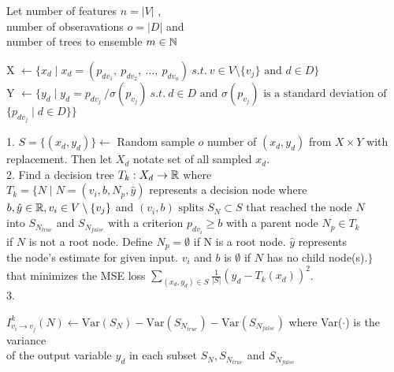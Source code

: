 \begin{algorithm}[H]
    \DontPrintSemicolon

    Let number of features $n = |V|$ , \\
    number of obseravations $o = |D|$ and \\
    number of trees to ensemble $ m \in \Bbb N$

     {
        X $\gets \{ x_d \mid x_d = (p_{dv_1},\: p_{dv_2},\: \ldots, \:p_{dv_{n}}) \: s.t. \: v \in V \setminus{\{v_j\}} \text{ and } d \in D \} \:$  \\
        Y $\gets \{ y_d  \mid y_d = p_{dv_j} \: / \sigma(p_{v_j}) \: s.t. \: d \in D \text{ and } \sigma(p_{v_j}) \text{ is a standard deviation of }$ \\
        $\{ p_{dv_j} \mid d \in D \} \}$\\

         {
            1. $S = \{(x_d, y_d)\} \gets $ Random sample $o$ number of $(x_d, y_d)$ from $X \times Y$ with replacement. Then let $X_d$ notate set of all sampled $x_d$. \\
            2. Find a decision tree $T_k: X_d \to \Bbb R$ where\\
            $T_k = \{ N \mid N = (v_i, b, N_p, \hat{y}) $ represents a decision node where \\ 
            $ b, \hat{y} \in \Bbb R, v_i \in V \setminus{\{v_j\}} $ and $(v_i, b) \text{ splits } S_N \subset S \text{ that reached the node } N $\\
            into $S_{N_{true}}$ and $S_{N_{false}}$ with a criterion $p_{dv_i} \ge b$ with a parent node $ N_p \in T_k$ \\             if $N$ is not a root node. Define $N_p = \emptyset$ if N is a root node. $\hat{y}$ represents \\
            the node's estimate for given input. $v_i$ and $b$ is $\emptyset$ if $N$ has no child node(s).$\}$\\
            that minimizes the MSE loss $\sum_{(x_d, y_d) \in S} \frac{1}{|S|}(y_d - T_k(x_d))^2$.\\
            3.
             {
                {
                    $I^k_{v_i \to v_j}(N) \gets \text{Var}(S_N) - \text{Var}(S_{N_{true}}) - \text{Var}(S_{N_{false}})$ where Var($\cdot$) is the variance\\
                    of the output variable $y_d$ in each subset $S_N, S_{N_{true}}$ and $S_{N_{false}}$           
                } 

}}}
\end{algorithm}
